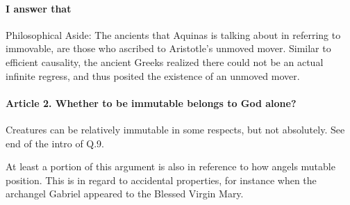 \documentclass{ucetd}
\begin{document}
\paragraph{I answer that}
Philosophical Aside: The ancients that Aquinas is talking about in referring to immovable, are those who ascribed to Aristotle's unmoved mover. Similar to efficient causality, the ancient Greeks realized there could not be an actual infinite regress, and thus posited the existence of an unmoved mover.

\paragraph{Article 2. Whether to be immutable belongs to God alone?}
Creatures can be relatively immutable in some respects, but not absolutely. See end of the intro of Q.9.

At least a portion of this argument is also in reference to how angels mutable position. This is in regard to accidental properties, for instance when the archangel Gabriel appeared to the Blessed Virgin Mary.
\end{document}
